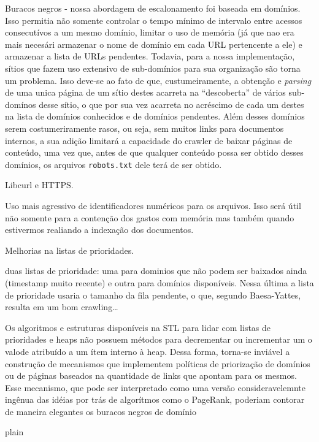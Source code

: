 \documentclass[10pt,twocolumn]{article}
\begin{document}
Buracos negros - nossa abordagem de escalonamento foi baseada em domínios. Isso
permitia não somente controlar o tempo mínimo de intervalo entre acessos
consecutívos a um mesmo domínio, limitar o uso de memória (já que nao era mais
necesári armazenar o nome de domínio em cada URL pertencente a ele) e armazenar
a lista de URLs pendentes. Todavia, para a nossa implementação, sítios que
fazem uso extensivo de sub-domínios para sua organização são torna um problema.
Isso deve-se ao fato de que, custumeiramente, a obtenção e \emph{parsing} de
uma unica página de um sítio destes acarreta na ``descoberta'' de vários
sub-domínos desse sítio, o que por sua vez acarreta no acréscimo de cada um
destes na lista de domínios conhecidos e de domínios pendentes. Além desses
domínios serem costumeriramente rasos, ou seja, sem muitos links para
documentos internos, a sua adição limitará a capacidade do crawler de baixar
páginas de conteúdo, uma vez que, antes de que qualquer conteúdo possa ser
obtido desses domínios, os arquivos \texttt{robots.txt} dele terá de ser
obtido.

Libcurl e HTTPS.

Uso mais agressivo de identificadores numéricos para os arquivos. Isso será
útil não somente para a contenção dos gastos com memória mas também quando
estivermos realiando a indexação dos documentos.

Melhorias na listas de prioridades.

duas listas de prioridade: uma para dominios que não podem ser baixados
ainda (timestamp muito recente) e outra para domínios disponíveis. Nessa
última a lista de prioridade usaria o tamanho da fila pendente, o que,
segundo Baesa-Yattes, resulta em um bom crawling\ldots

 Os algoritmos e estruturas disponíveis na
STL para lidar com listas de prioridades e heaps não possuem métodos para
decrementar ou incrementar um o valode atribuído a um ítem interno à heap.
Dessa forma, torna-se inviável a construção de mecanismos que implementem
políticas de priorização de domínios ou de páginas baseados na quantidade de
links que apontam para os mesmos. Esse mecanismo, que pode ser interpretado
como uma versão consideravelemnte ingênua das idéias por trás de algorítmos
como o PageRank, poderiam contorar de maneira elegantes os buracos negros de
domínio

\nocite{stroustrup97}
 {plain}

\end{document}
